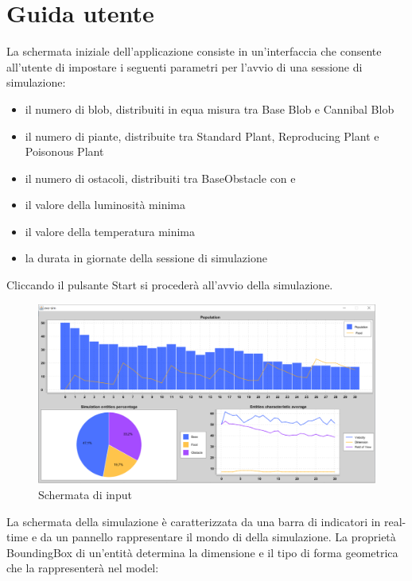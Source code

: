 \section{Guida utente}

La schermata iniziale dell'applicazione consiste in un'interfaccia che consente all'utente di impostare i seguenti parametri per l'avvio di una sessione di simulazione:
\begin{itemize}
\item il numero di blob, distribuiti in equa misura tra Base Blob e Cannibal Blob
\item il numero di piante, distribuite tra Standard Plant, Reproducing Plant e Poisonous Plant
\item il numero di ostacoli, distribuiti tra BaseObstacle con  e 
\item il valore della luminosità minima
\item il valore della temperatura minima
\item la durata in giornate della sessione di simulazione
\end{itemize}

Cliccando il pulsante Start si procederà all'avvio della simulazione.

\begin{figure}[h!]
\centering
\includegraphics[width=\textwidth, scale=0.44]{img/ResultsInterface.png}
\caption{Schermata di input}
\label{fig:ResultsInterface}
\end{figure}

La schermata della simulazione è caratterizzata da una barra di indicatori in real-time e da un pannello rappresentare il mondo di della simulazione. La proprietà BoundingBox di un'entità determina la dimensione e il tipo di forma geometrica che la rappresenterà nel model:

